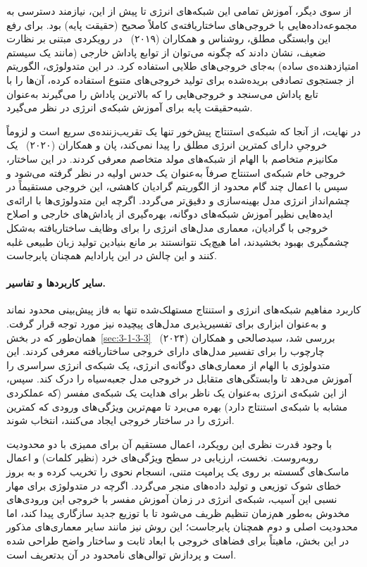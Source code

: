 از سوی دیگر، آموزش تمامی این شبکه‌های انرژی تا پیش از این، نیازمند دسترسی به مجموعه‌داده‌هایی با خروجی‌های ساختاریافته‌ی کاملاً صحیح (حقیقت پایه) بود. برای رفع این وابستگی مطلق، روشناس و همکاران (۲۰۱۹)~\cite{rooshenas2019searchguided} در رویکردی مبتنی بر نظارت ضعیف، نشان دادند که چگونه می‌توان از توابع پاداش خارجی (مانند یک سیستم امتیازدهنده‌ی ساده) به‌جای خروجی‌های طلایی استفاده کرد. در این متدولوژی، الگوریتم از جستجوی تصادفی بریده‌شده برای تولید خروجی‌های متنوع استفاده کرده، آن‌ها را با تابع پاداش می‌سنجد و خروجی‌هایی را که بالاترین پاداش را می‌گیرند به‌عنوان شبه‌حقیقت پایه برای آموزش شبکه‌ی انرژی در نظر می‌گیرد.

در نهایت، از آنجا که شبکه‌ی استنتاج پیش‌خور تنها یک تقریب‌زننده‌ی سریع است و لزوماً خروجیِ دارای کمترین انرژی مطلق را پیدا نمی‌کند، پان و همکاران (۲۰۲۰)~\cite{pan2020adversarial} یک مکانیزم متخاصم با الهام از شبکه‌های مولد متخاصم معرفی کردند. در این ساختار، خروجی خام شبکه‌ی استنتاج صرفاً به‌عنوان یک حدس اولیه در نظر گرفته می‌شود و سپس با اعمال چند گام محدود از الگوریتم گرادیان کاهشی، این خروجی مستقیماً در چشم‌انداز انرژی مدل بهینه‌سازی و دقیق‌تر می‌گردد. اگرچه این متدولوژی‌ها با ارائه‌ی ایده‌هایی نظیر آموزش شبکه‌های دوگانه، بهره‌گیری از پاداش‌های خارجی و اصلاح خروجی با گرادیان، معماری مدل‌های انرژی را برای وظایف ساختاریافته به‌شکل چشمگیری بهبود بخشیدند، اما هیچ‌یک نتوانستند بر مانع بنیادین تولید زبان طبیعی غلبه کنند و این چالش در این پارادایم همچنان پابرجاست.


\paragraph{سایر کاربردها و تفاسیر.}

کاربرد مفاهیم شبکه‌های انرژی و استنتاج مستهلک‌شده تنها به فاز پیش‌بینی محدود نماند و به‌عنوان ابزاری برای تفسیرپذیری مدل‌های پیچیده نیز مورد توجه قرار گرفت. همان‌طور که در بخش~\ref{sec:3-1-3-3} بررسی شد، سیدصالحی و همکاران (۲۰۲۴)~\cite{seyyedsalehi2024sointer} چارچوب  را برای تفسیر مدل‌های دارای خروجی ساختاریافته معرفی کردند. این متدولوژی با الهام از معماری‌های دوگانه‌ی انرژی، یک شبکه‌ی انرژی سراسری را آموزش می‌دهد تا وابستگی‌های متقابل در خروجی مدل جعبه‌سیاه را درک کند. سپس، از این شبکه‌ی انرژی به‌عنوان یک ناظر برای هدایت یک شبکه‌ی مفسر (که عملکردی مشابه با شبکه‌ی استنتاج دارد) بهره می‌برد تا مهم‌ترین ویژگی‌های ورودی که کمترین انرژی را در ساختار خروجی ایجاد می‌کنند، انتخاب شوند. 

با وجود قدرت نظری این رویکرد، اعمال مستقیم آن برای ممیزی با دو محدودیت روبه‌روست. نخست، ارزیابی در سطح ویژگی‌های خرد (نظیر کلمات) و اعمال ماسک‌های گسسته بر روی یک پرامپت متنی، انسجام نحوی را تخریب کرده و به بروز خطای شوک توزیعی و تولید داده‌های  منجر می‌گردد. اگرچه در متدولوژی  برای مهار نسبی این آسیب، شبکه‌ی انرژی در زمان آموزش مفسر با خروجی این ورودی‌های مخدوش به‌طور هم‌زمان تنظیم ظریف می‌شود تا با توزیع جدید سازگاری پیدا کند، اما محدودیت اصلی و دوم همچنان پابرجاست؛ این روش نیز مانند سایر معماری‌های مذکور در این بخش، ماهیتاً برای فضاهای خروجی با ابعاد ثابت و ساختار واضح طراحی شده است و پردازش توالی‌های نامحدود در آن بدتعریف است.

